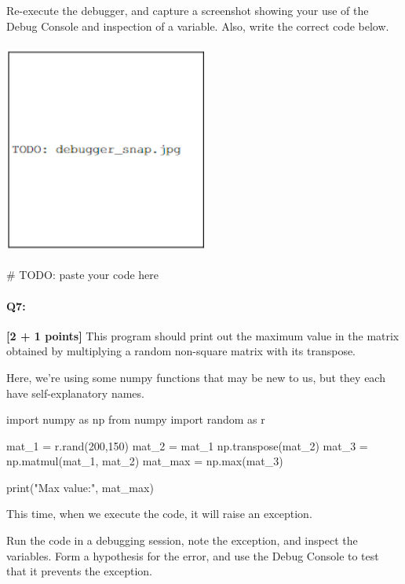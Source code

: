 \documentclass[11pt]{article}
\begin{document}
\begin{tcolorbox}[colback=orange!5!white,colframe=orange!75!black,enhanced jigsaw,breakable,pad at break*=1mm]
Re-execute the debugger, and capture a screenshot showing your use of the Debug Console and inspection of a variable. Also, write the correct code below.
\end{tcolorbox}

\begin{tcolorbox}[colback=white!5!white,colframe=green!75!black,height=8cm,height fill]
    \includegraphics[width=0.5\textwidth,height=7cm,keepaspectratio]{images/TODO_debugger_snap.jpg}
    
    \begin{python}
    # TODO: paste your code here 
    \end{python}
\end{tcolorbox}



\pagebreak
\paragraph{Q7:} \textbf{[2 + 1 points]} This program should print out the maximum value in the matrix obtained by multiplying a random non-square matrix with its transpose.

Here, we're using some numpy functions that may be new to us, but they each have self-explanatory names.

\begin{python}
import numpy as np
from numpy import random as r

mat_1 = r.rand(200,150)
mat_2 = mat_1
np.transpose(mat_2)
mat_3 = np.matmul(mat_1, mat_2)
mat_max = np.max(mat_3)

print("Max value:", mat_max)
\end{python}

This time, when we execute the code, it will raise an exception.

\begin{tcolorbox}[colback=orange!5!white,colframe=orange!75!black]
Run the code in a debugging session, note the exception, and inspect the variables. Form a hypothesis for the error, and use the Debug Console to test that it prevents the exception. 
\end{tcolorbox}
\end{document}
